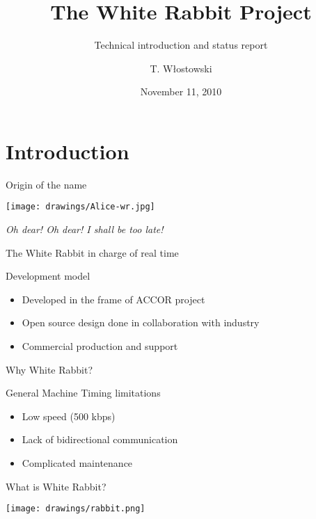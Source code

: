 \documentclass[xcolor=dvipsnames]{beamer}
\title[WR Project Status\hspace{2em}\insertframenumber/
\inserttotalframenumber]{The White Rabbit Project}
\subtitle{Technical introduction and status report}
\author{T. Włostowski}
\date{November 11, 2010}
\institute%
{
  BE-CO Hardware and Timing section\\
  CERN
 }
\begin{document}
\frame{\titlepage}


\section{Introduction}
\begin{frame}{Origin of the name}
\begin{center}
\texttt{[image: drawings/Alice-wr.jpg]}

\textit{Oh dear! Oh dear! I shall be too late!}\\
\begin{small}
The White Rabbit in charge of real time
\end{small}
\end{center}
\end{frame}


\begin{frame}{Development model}
\begin{itemize}
\item Developed in the frame of ACCOR project
\item Open source design done in collaboration with industry
\item Commercial production and support
\end{itemize}
\end{frame}

\begin{frame}{Why White Rabbit?}
\begin{block}{General Machine Timing limitations}
\begin{itemize}
\item Low speed (500 kbps)
\item Lack of bidirectional communication
\item Complicated maintenance
\end{itemize}
\end{block}
\end{frame}

\begin{frame}{What is White Rabbit?}
\begin{center}
\texttt{[image: drawings/rabbit.png]}
\end{center}
\end{frame}
\end{document}
